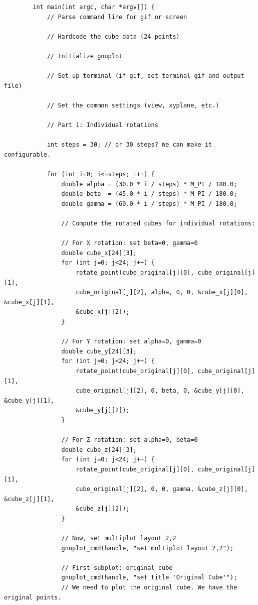 \documentclass[a4paper,10pt]{article}
\begin{document}
\begin{verbatim}
        int main(int argc, char *argv[]) {
            // Parse command line for gif or screen

            // Hardcode the cube data (24 points)

            // Initialize gnuplot

            // Set up terminal (if gif, set terminal gif and output file)

            // Set the common settings (view, xyplane, etc.)

            // Part 1: Individual rotations

            int steps = 30; // or 30 steps? We can make it configurable.

            for (int i=0; i<=steps; i++) {
                double alpha = (30.0 * i / steps) * M_PI / 180.0;
                double beta  = (45.0 * i / steps) * M_PI / 180.0;
                double gamma = (60.0 * i / steps) * M_PI / 180.0;

                // Compute the rotated cubes for individual rotations:

                // For X rotation: set beta=0, gamma=0
                double cube_x[24][3];
                for (int j=0; j<24; j++) {
                    rotate_point(cube_original[j][0], cube_original[j][1],
                    cube_original[j][2], alpha, 0, 0, &cube_x[j][0], &cube_x[j][1],
                    &cube_x[j][2]);
                }

                // For Y rotation: set alpha=0, gamma=0
                double cube_y[24][3];
                for (int j=0; j<24; j++) {
                    rotate_point(cube_original[j][0], cube_original[j][1],
                    cube_original[j][2], 0, beta, 0, &cube_y[j][0], &cube_y[j][1],
                    &cube_y[j][2]);
                }

                // For Z rotation: set alpha=0, beta=0
                double cube_z[24][3];
                for (int j=0; j<24; j++) {
                    rotate_point(cube_original[j][0], cube_original[j][1],
                    cube_original[j][2], 0, 0, gamma, &cube_z[j][0], &cube_z[j][1],
                    &cube_z[j][2]);
                }

                // Now, set multiplot layout 2,2
                gnuplot_cmd(handle, "set multiplot layout 2,2");

                // First subplot: original cube
                gnuplot_cmd(handle, "set title 'Original Cube'");
                // We need to plot the original cube. We have the original points.


\end{verbatim}
\end{document}

